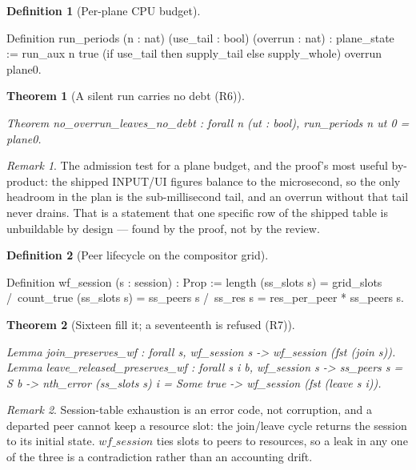 \documentclass[10pt,journal,compsoc,twocolumn]{article}
\newtheorem{theorem}{Theorem}[section]
\theoremstyle{definition}
\newtheorem{definition}{Definition}[section]
\theoremstyle{remark}
\newtheorem{remark}{Remark}[section]
\theoremstyle{plain}
\begin{document}
\begin{definition}[Per-plane CPU budget]
\begin{coc}
Definition run_periods (n : nat) (use_tail : bool) (overrun : nat) : plane_state :=
  run_aux n true (if use_tail then supply_tail else supply_whole) overrun plane0.
\end{coc}\end{definition}
\begin{theorem}[A silent run carries no debt (R6)]
\begin{coc}
Theorem no_overrun_leaves_no_debt : forall n (ut : bool), run_periods n ut 0 = plane0.
\end{coc}\end{theorem}
\begin{remark}
The admission test for a plane budget, and the proof's most useful by-product:
the shipped INPUT/UI figures balance to the microsecond, so the only headroom in
the plan is the sub-millisecond tail, and an overrun without that tail never
drains. That is a statement that one specific row of the shipped table is
unbuildable by design --- found by the proof, not by the review.
\end{remark}

\begin{definition}[Peer lifecycle on the compositor grid]
\begin{coc}
Definition wf_session (s : session) : Prop :=
  length (ss_slots s) = grid_slots /\ count_true (ss_slots s) = ss_peers s
  /\ ss_res s = res_per_peer * ss_peers s.
\end{coc}\end{definition}
\begin{theorem}[Sixteen fill it; a seventeenth is refused (R7)]
\begin{coc}
Lemma join_preserves_wf : forall s, wf_session s -> wf_session (fst (join s)).
Lemma leave_released_preserves_wf : forall s i b,
  wf_session s -> ss_peers s = S b -> nth_error (ss_slots s) i = Some true ->
  wf_session (fst (leave s i)).
\end{coc}\end{theorem}
\begin{remark}
Session-table exhaustion is an error code, not corruption, and a departed peer
cannot keep a resource slot: the join/leave cycle returns the session to its
initial state. \(\mathit{wf\_session}\) ties slots to peers to resources, so a
leak in any one of the three is a contradiction rather than an accounting drift.
\end{remark}
\end{document}
